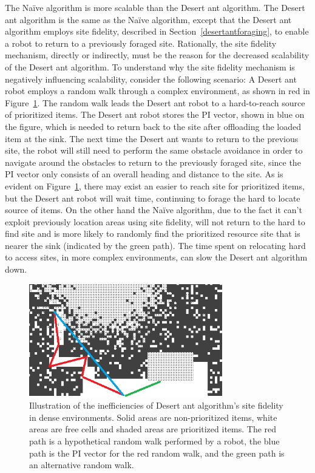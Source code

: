 The Na\"ive algorithm is more scalable than the Desert ant algorithm. The Desert ant algorithm is the same as the Na\"ive algorithm, except that the Desert ant algorithm employs site fidelity, described in Section~\ref{desertantforaging}, to enable a robot to return to a previously foraged site. Rationally, the site fidelity mechanism, directly or indirectly, must be the reason for the decreased scalability of the Desert ant algorithm. To understand why the site fidelity mechanism is negatively influencing scalability, consider the following scenario: A Desert ant robot employs a random walk through a complex environment, as shown in red in Figure~\ref{fig:desertantsitefidelity}. The random walk leads the Desert ant robot to a hard-to-reach source of prioritized items. The Desert ant robot stores the PI vector, shown in blue on the figure, which is needed to return back to the site after offloading the loaded item at the sink. The next time the Desert ant wants to return to the previous site, the robot will still need to perform the same obstacle avoidance in order to navigate around the obstacles to return to the previously foraged site, since the PI vector only consists of an overall heading and distance to the site. As is evident on Figure~\ref{fig:desertantsitefidelity}, there may exist an easier to reach site for prioritized items, but the Desert ant robot will wait time, continuing to forage the hard to locate source of items. On the other hand the Na\"ive algorithm, due to the fact it can't exploit previously location areas using site fidelity, will not return to the hard to find site and is more likely to randomly find the prioritized resource site that is nearer the sink (indicated by the green path). The time spent on relocating hard to access sites, in more complex environments, can slow the Desert ant algorithm down.

\begin{figure}[!htb]
\centering
\includegraphics[width=0.75\textwidth]{chapters/chapter6/figures/problem-scalability-desertant.png}
\caption{Illustration of the inefficiencies of Desert ant algorithm's site fidelity in dense environments. Solid areas are non-prioritized items, white areas are free cells and shaded areas are prioritized items. The red path is a hypothetical random walk performed by a robot, the blue path is the PI vector for the red random walk, and the green path is an alternative random walk.}
\label{fig:desertantsitefidelity}
\end{figure}

